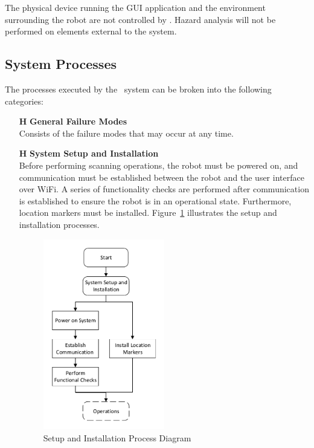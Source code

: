 \documentclass[12pt]{article}
\newcounter{haznum} %
\begin{document}
The physical device running the GUI application and the environment surrounding the robot are not controlled by \progname. Hazard analysis will not be performed on elements external to the system.
 
\subsection{System Processes}

 \noindent The processes executed by the \progname ~system can be broken into the following categories:

\noindent \begin{itemize}
\item[\textbf{H\thehaznum \label{H0}}] \textbf{General Failure Modes}\\
Consists of the failure modes that may occur at any time. 

\item[\textbf{H\refstepcounter{haznum}\thehaznum \label{H1}}] \textbf{System Setup and Installation}\\
Before performing scanning operations, the robot must be powered on, and communication must be established between the robot and the user interface over WiFi. A series of functionality checks are performed after communication is established to ensure the robot is in an operational state. Furthermore, location markers must be installed. Figure~\ref{fig_Setup} illustrates the setup and installation processes.
\begin{figure}[H]
\centering 
\includegraphics[width=0.5\textwidth]{Figures/Setup Processes.pdf}
\caption{Setup and Installation Process Diagram}
\label{fig_Setup}
\end{figure}


\end{itemize}
\end{document}
